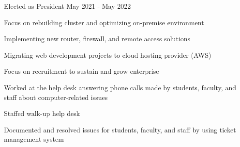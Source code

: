 \documentclass[]{deedy-resume-reversed}
\begin{document}
\begin{minipage}[t]{0.58\textwidth}
\begin{tightemize}
\item Elected as President May 2021 - May 2022
\item Focus on rebuilding cluster and optimizing on-premise environment
\item Implementing new router, firewall, and remote access solutions
\item Migrating web development projects to cloud hosting provider (AWS)
\item Focus on recruitment to sustain and grow enterprise
\end{tightemize}
\sectionsep


\begin{tightemize}
\item Worked at the help desk answering phone calls made by students, faculty, and staff about computer-related issues
\item Staffed walk-up help desk
\item Documented and resolved issues for students, faculty, and staff by using ticket management system
\end{tightemize}
\sectionsep


\end{minipage}
\end{document}
